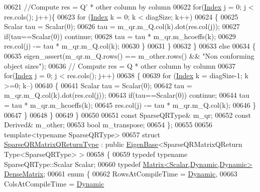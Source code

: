 \begin{DoxyCode}
00621       \textcolor{comment}{//Compute res = Q' * other column by column}
00622       \textcolor{keywordflow}{for}(\hyperlink{namespace_eigen_a62e77e0933482dafde8fe197d9a2cfde}{Index} j = 0; j < res.cols(); j++)\{
00623         \textcolor{keywordflow}{for} (\hyperlink{namespace_eigen_a62e77e0933482dafde8fe197d9a2cfde}{Index} k = 0; k < diagSize; k++)
00624         \{
00625           Scalar tau = Scalar(0);
00626           tau = m\_qr.m\_Q.col(k).dot(res.col(j));
00627           \textcolor{keywordflow}{if}(tau==Scalar(0)) \textcolor{keywordflow}{continue};
00628           tau = tau * m\_qr.m\_hcoeffs(k);
00629           res.col(j) -= tau * m\_qr.m\_Q.col(k);
00630         \}
00631       \}
00632     \}
00633     \textcolor{keywordflow}{else}
00634     \{
00635       eigen\_assert(m\_qr.m\_Q.rows() == m\_other.rows() && \textcolor{stringliteral}{"Non conforming object sizes"});
00636       \textcolor{comment}{// Compute res = Q * other column by column}
00637       \textcolor{keywordflow}{for}(\hyperlink{namespace_eigen_a62e77e0933482dafde8fe197d9a2cfde}{Index} j = 0; j < res.cols(); j++)
00638       \{
00639         \textcolor{keywordflow}{for} (\hyperlink{namespace_eigen_a62e77e0933482dafde8fe197d9a2cfde}{Index} k = diagSize-1; k >=0; k--)
00640         \{
00641           Scalar tau = Scalar(0);
00642           tau = m\_qr.m\_Q.col(k).dot(res.col(j));
00643           \textcolor{keywordflow}{if}(tau==Scalar(0)) \textcolor{keywordflow}{continue};
00644           tau = tau * m\_qr.m\_hcoeffs(k);
00645           res.col(j) -= tau * m\_qr.m\_Q.col(k);
00646         \}
00647       \}
00648     \}
00649   \}
00650   
00651   \textcolor{keyword}{const} SparseQRType& m\_qr;
00652   \textcolor{keyword}{const} Derived& m\_other;
00653   \textcolor{keywordtype}{bool} m\_transpose;
00654 \};
00655 
00656 \textcolor{keyword}{template}<\textcolor{keyword}{typename} SparseQRType>
00657 \textcolor{keyword}{struct }\hyperlink{struct_eigen_1_1_sparse_q_r_matrix_q_return_type}{SparseQRMatrixQReturnType} : \textcolor{keyword}{public} \hyperlink{group___core___module_struct_eigen_1_1_eigen_base}{EigenBase}<SparseQRMatrixQReturn
      Type<SparseQRType> >
00658 \{  
00659   \textcolor{keyword}{typedef} \textcolor{keyword}{typename} SparseQRType::Scalar Scalar;
00660   \textcolor{keyword}{typedef} \hyperlink{group___core___module}{Matrix<Scalar,Dynamic,Dynamic>} 
      \hyperlink{group___core___module}{DenseMatrix};
00661   \textcolor{keyword}{enum} \{
00662     RowsAtCompileTime = \hyperlink{namespace_eigen_ad81fa7195215a0ce30017dfac309f0b2}{Dynamic},
00663     ColsAtCompileTime = \hyperlink{namespace_eigen_ad81fa7195215a0ce30017dfac309f0b2}{Dynamic}

\end{DoxyCode}
